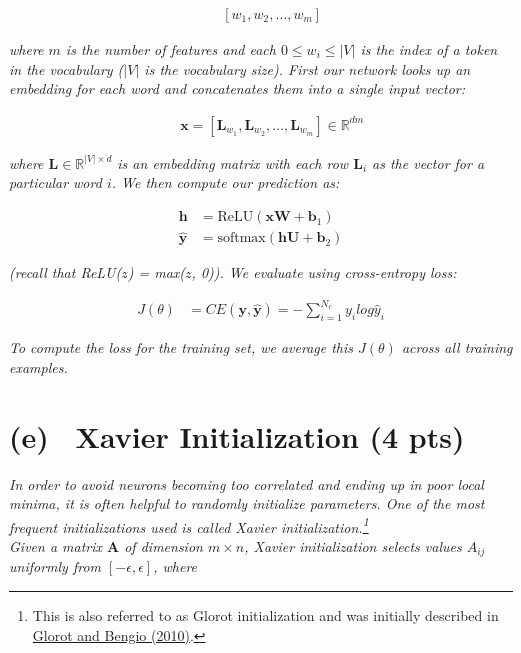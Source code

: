 \documentclass[fleqn]{MJD}
\newcommand{\subproblem}[2]{\section{(#1)~ #2}}
\newcommand{\0}{\emptyset}
\begin{document}
\begin{align}
	&&	[w_{1}, w_{2}, \dots, w_{m}] \nonumber
\end{align}

\noindent \textit{where $m$ is the number of features and each $0 \leq w_{i} \le \vert V \vert$ is the index of a token in the vocabulary ($\vert V \vert$ is the vocabulary size). First our network looks up an embedding for each word and concatenates them into a single input vector:}

\begin{align}
	&& \bm{x} = [\bm{L}_{w_{1}}, \bm{L}_{w_{2}}, \dots, \bm{L}_{w_{m}}] \in \mathbb{R}^{dm} \nonumber
\end{align}

\noindent \textit{where $\bm{L} \in \mathbb{R}^{\vert V \vert \times d}$ is an embedding matrix with each row $\bm{L}_{i}$ as the vector for a particular word $i$. We then compute our prediction as:}

\begin{align}
	\bm{h} &= \text{ReLU}(\bm{xW} + \bm{b}_{1}) \\
	\hat{\bm{y}} &= \text{softmax}(\bm{hU} + \bm{b}_{2}) 
\end{align}

\noindent \textit{(recall that ReLU($z$) = max($z$, 0)). We evaluate using cross-entropy loss:}

\begin{align}
	J(\theta) &= CE(\bm{y}, \hat{\bm{y}}) = -\sum\limits_{i = 1}^{N_{c}} y_{i} log \hat{y}_{i}
\end{align}

\noindent \textit{To compute the loss for the training set, we average this $J(\theta)$ across all training examples.} 





\newpage
\subproblem{e}{Xavier Initialization (4 pts)}
\label{prob:2e}

\textit{In order to avoid neurons becoming too correlated and ending up in poor local minima, it is often helpful to randomly initialize parameters. One of the most frequent initializations used is called Xavier initialization.\footnote{This is also referred to as Glorot initialization and was initially described in \hyperref{http://jmlr.org/proceedings/papers/v9/glorot10a/glorot10a.pdf}{}{}{Glorot and Bengio (2010)}.}} \\

\noindent \textit{Given a matrix $\bm{A}$ of dimension $m \times n$, Xavier initialization selects values $A_{ij}$ uniformly from $[-\epsilon, \epsilon]$, where}
\end{document}
